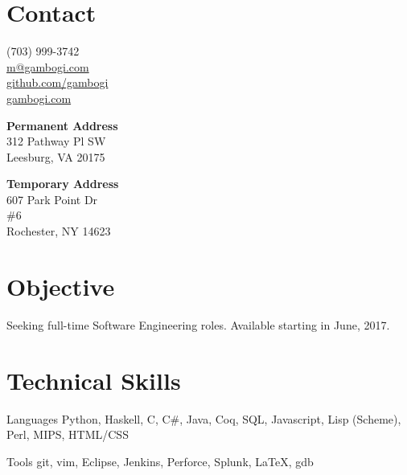 \documentclass[letter,margin,line]{resume}
\begin{document}
    \begin{resume}
        \section{\mysidestyle Contact} \vspace{2mm}

        \begin{multicols}{3}
                  (703) 999-3742 \\
                  \href{mailto:m@gambogi.com}{m@gambogi.com} \\
                  \href{https://github.com/gambogi}{github.com/gambogi}\\
                  \href{http://gambogi.com}{gambogi.com}

            \columnbreak
            {\bf Permanent Address} \\
                  312 Pathway Pl SW \\
                  Leesburg, VA 20175

            \columnbreak
            {\bf Temporary Address} \\
                   607 Park Point Dr\\
                   \#6\\
                   Rochester, NY 14623

        \end{multicols}

        \section{\mysidestyle Objective}
            Seeking full-time Software Engineering roles.
            Available starting in June, 2017.

        \section{\mysidestyle Technical Skills}
        \begin{compactdesc}
        \item[Languages] { \small
                 Python,
                 Haskell,
                 C,
                 C\#,
                 Java,
                 Coq,
                 SQL,
                 Javascript,
                 Lisp (Scheme),
                 Perl,
                 MIPS,
                 HTML/CSS
            }
        \item[Tools] { \small
                git,
                vim,
                Eclipse,
                Jenkins,
                Perforce,
                Splunk,
                \LaTeX,
                gdb
            }
        \end{compactdesc}


\end{resume}
\end{document}

